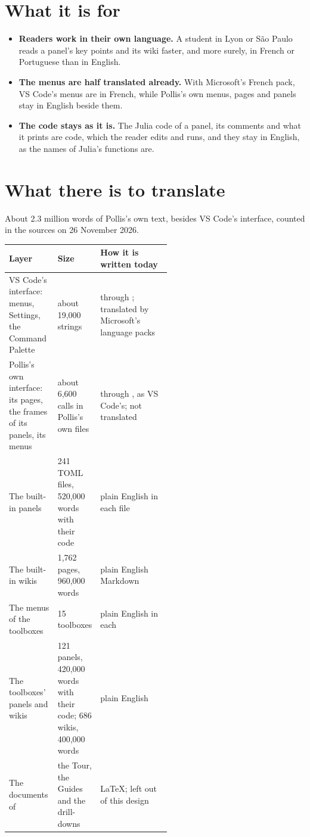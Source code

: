 \tableofcontents

\section{What it is for}\label{sec:why}
\begin{itemize}
  \item \textbf{Readers work in their own language.} A student in Lyon or São Paulo reads a panel's key points and
    its wiki faster, and more surely, in French or Portuguese than in English.
  \item \textbf{The menus are half translated already.} With Microsoft's French pack, VS Code's menus are in French,
    while Pollis's own menus, pages and panels stay in English beside them.
  \item \textbf{The code stays as it is.} The Julia code of a panel, its comments and what it prints are code, which
    the reader edits and runs, and they stay in English, as the names of Julia's functions are.
\end{itemize}

\section{What there is to translate}\label{sec:what}
About 2.3 million words of Pollis's own text, besides VS Code's interface, counted in the sources on 26 November 2026.

\begin{center}\small
\renewcommand{\arraystretch}{1.2}
\begin{tabularx}{\linewidth}{@{}p{0.3\linewidth}p{0.24\linewidth}L@{}}
\toprule
\textbf{Layer} & \textbf{Size} & \textbf{How it is written today}\\
\midrule
VS Code's interface: menus, Settings, the Command Palette & about 19,000 strings & through ; translated by
  Microsoft's language packs\\
Pollis's own interface: its pages, the frames of its panels, its menus & about 6,600  calls in
  Pollis's own files & through , as VS Code's; not translated\\
The built-in panels & 241 TOML files, 520,000 words with their code & plain English in each file\\
The built-in wikis & 1,762 pages, 960,000 words & plain English Markdown\\
The menus of the toolboxes & 15 toolboxes & plain English in each \\
The toolboxes' panels and wikis & 121 panels, 420,000 words with their code; 686 wikis, 400,000 words & plain
  English\\
The documents of  & the Tour, the Guides and the drill-downs & LaTeX; left out of this
  design\\
\bottomrule
\end{tabularx}
\end{center}

